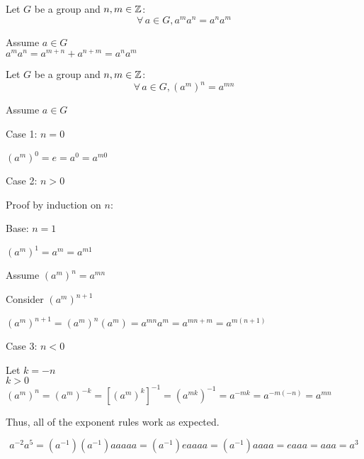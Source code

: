 \documentclass[letterpaper,12pt,fleqn]{article}
\begin{document}
\begin{corollary}
  Let $G$ be a group and $n,m\in\mathbb{Z}$:
  \[\forall\,a\in G,a^ma^n=a^na^m\]
\end{corollary}

\begin{theproof}
  Assume $a\in G$ \\
  $a^ma^n=a^{m+n}+a^{n+m}=a^na^m$
\end{theproof}

\begin{theorem}
  Let $G$ be a group and $n,m\in\mathbb{Z}$:
  \[\forall\,a\in G,(a^m)^n=a^{mn}\]
\end{theorem}

\begin{theproof}
  Assume $a\in G$
  
  \begin{description}
  \item{Case 1: $n=0$}

    $(a^m)^0=e=a^0=a^{m0}$

  \item{Case 2: $n>0$}

    Proof by induction on $n$:

    \begin{description}
    \item{Base: $n=1$}

      $(a^m)^1=a^m=a^{m1}$

    \item{Assume $(a^m)^n=a^{mn}$}

    \item{Consider $(a^m)^{n+1}$}

      $(a^m)^{n+1}=(a^m)^n(a^m)=a^{mn}a^m=a^{mn+m}=a^{m(n+1)}$
    \end{description}

  \item{Case 3: $n<0$}

    Let $k=-n$ \\
    $k>0$ \\
    $(a^m)^n=(a^m)^{-k}=[(a^m)^k]^{-1}=(a^{mk})^{-1}=a^{-mk}=a^{-m(-n)}=a^{mn}$
  \end{description}
\end{theproof}

Thus, all of the exponent rules work as expected.

\begin{example}
  \[a^{-2}a^5=(a^{-1})(a^{-1})aaaaa=(a^{-1})eaaaa=(a^{-1})aaaa=eaaa=aaa=a^3\]
\end{example}
\end{document}
